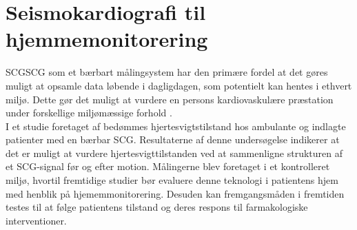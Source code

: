 \section{Seismokardiografi til hjemmemonitorering}
\gls{SCG}SCG som et bærbart målingsystem har den primære fordel at det gøres muligt at opsamle data løbende i dagligdagen, som potentielt kan hentes i ethvert miljø. Dette gør det muligt at vurdere en persons kardiovaskulære præstation under forskellige miljømæssige forhold \citep{inan2015}. \\
I et studie foretaget af \cite{Inan2018} bedømmes hjertesvigtstilstand hos ambulante og indlagte patienter med en bærbar SCG. Resultaterne af denne undersøgelse indikerer at det er muligt at vurdere hjertesvigttilstanden ved at sammenligne strukturen af et SCG-signal før og efter motion. Målingerne blev foretaget i et kontrolleret miljø, hvortil fremtidige studier bør evaluere denne teknologi i patientens hjem med henblik på hjememmonitorering. Desuden kan fremgangsmåden i fremtiden testes til at følge patientens tilstand og deres respons til farmakologiske interventioner. \citep{Inan2018} 

